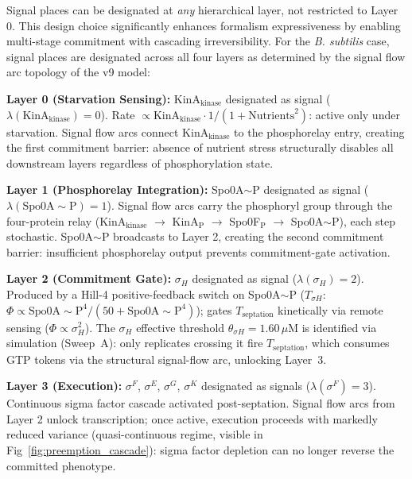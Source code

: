 \documentclass[10pt,letterpaper]{article}
\begin{document}
Signal places can be designated at \textit{any} hierarchical layer, not restricted to Layer 0. This design choice significantly enhances formalism expressiveness by enabling multi-stage commitment with cascading irreversibility. For the \textit{B. subtilis} case, signal places are designated across all four layers as determined by the signal flow arc topology of the v9 model:

\vspace{3pt}
\noindent\textbf{Layer 0 (Starvation Sensing):} KinA$_{\text{kinase}}$ designated as signal ($\lambda(\text{KinA}_{\text{kinase}}) = 0$). Rate $\propto \text{KinA}_{\text{kinase}} \cdot 1/(1+\text{Nutrients}^2)$: active only under starvation. Signal flow arcs connect KinA$_{\text{kinase}}$ to the phosphorelay entry, creating the first commitment barrier: absence of nutrient stress structurally disables all downstream layers regardless of phosphorylation state.

\vspace{3pt}
\noindent\textbf{Layer 1 (Phosphorelay Integration):} Spo0A$\sim$P designated as signal ($\lambda(\text{Spo0A}{\sim}\text{P}) = 1$). Signal flow arcs carry the phosphoryl group through the four-protein relay (KinA$_{\text{kinase}}$ $\to$ KinA$_{\text{P}}$ $\to$ Spo0F$_{\text{P}}$ $\to$ Spo0A$\sim$P), each step stochastic. Spo0A$\sim$P broadcasts to Layer 2, creating the second commitment barrier: insufficient phosphorelay output prevents commitment-gate activation.

\vspace{3pt}
\noindent\textbf{Layer 2 (Commitment Gate):} $\sigma_H$ designated as signal ($\lambda(\sigma_H) = 2$). Produced by a Hill-4 positive-feedback switch on Spo0A$\sim$P ($T_{\sigma H}$: $\Phi \propto \text{Spo0A}{\sim}\text{P}^4 / (50 + \text{Spo0A}{\sim}\text{P}^4)$); gates $T_{\text{septation}}$ kinetically via remote sensing ($\Phi \propto \sigma_H^2$). The $\sigma_H$ effective threshold $\theta_{\sigma H} = 1.60\,\mu$M is identified via simulation (Sweep~A): only replicates crossing it fire $T_{\text{septation}}$, which consumes GTP tokens via the structural signal-flow arc, unlocking Layer~3.

\vspace{3pt}
\noindent\textbf{Layer 3 (Execution):} $\sigma^F$, $\sigma^E$, $\sigma^G$, $\sigma^K$ designated as signals ($\lambda(\sigma^F) = 3$). Continuous sigma factor cascade activated post-septation. Signal flow arcs from Layer 2 unlock transcription; once active, execution proceeds with markedly reduced variance (quasi-continuous regime, visible in Fig~\ref{fig:preemption_cascade}): sigma factor depletion can no longer reverse the committed phenotype.
\end{document}
